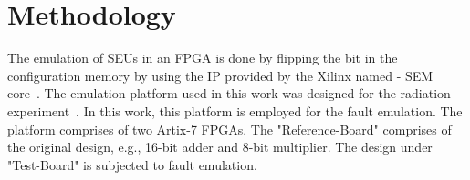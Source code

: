 



\section{Methodology}
\label{Methodology}

The emulation of SEUs in an FPGA is done by flipping the bit in the configuration memory by using the IP provided by the Xilinx named - SEM core~\citep{xilinx}. The emulation platform used in this work was designed for the radiation experiment~\citep{hobeika2014multi}. In this work, this platform is employed for the fault emulation. The platform comprises of two Artix-7 FPGAs. The "Reference-Board" comprises of the original design, e.g., 16-bit adder and 8-bit multiplier. The design under "Test-Board" is subjected to fault emulation.  





